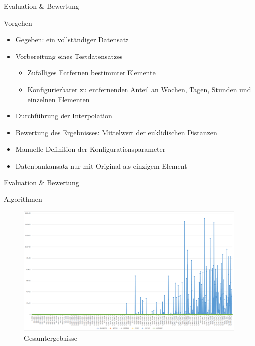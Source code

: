 \begin{frame}{Evaluation \& Bewertung}
\begin{block}{Vorgehen}
\begin{itemize}
	\item Gegeben: ein vollständiger Datensatz
	\item Vorbereitung eines Testdatensatzes
	\begin{itemize}
		\item Zufälliges Entfernen bestimmter Elemente
		\item Konfigurierbarer zu entfernenden Anteil an Wochen, Tagen, Stunden und einzelnen Elementen
	\end{itemize}
	\item Durchführung der Interpolation
	\item Bewertung des Ergebnisses: Mittelwert der euklidischen Distanzen
	\item Manuelle Definition der Konfigurationsparameter
	\item Datenbankansatz nur mit Original als einzigem Element
\end{itemize}
\end{block}
\end{frame}

\begin{frame}{Evaluation \& Bewertung}
\begin{block}{Algorithmen}
\begin{figure}
	\centering
	\includegraphics[width=1\textwidth]{pics/evaluation-algorithms-1.png}
	\caption{Gesamtergebnisse}
\end{figure}
\end{block}
\end{frame}

